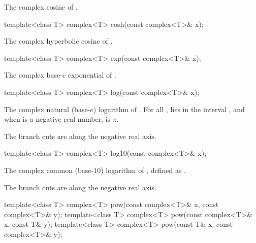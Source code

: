 \begin{itemdescr}
\pnum
\returns
The complex cosine of .
\end{itemdescr}

%
\begin{itemdecl}
template<class T> complex<T> cosh(const complex<T>& x);
\end{itemdecl}

\begin{itemdescr}
\pnum
\returns
The complex hyperbolic cosine of .
\end{itemdescr}

%
\begin{itemdecl}
template<class T> complex<T> exp(const complex<T>& x);
\end{itemdecl}

\begin{itemdescr}
\pnum
\returns
The complex base-$e$ exponential of .
\end{itemdescr}

%
\begin{itemdecl}
template<class T> complex<T> log(const complex<T>& x);
\end{itemdecl}

\begin{itemdescr}
\pnum
\returns
The complex natural (base-$e$) logarithm of . For all ,
 lies in the interval \crange{$-\pi$}{$\pi$}, and
when  is a negative real number,  is $\pi$.

\pnum
\remarks
The branch cuts are along the negative real axis.
\end{itemdescr}

%
\begin{itemdecl}
template<class T> complex<T> log10(const complex<T>& x);
\end{itemdecl}

\begin{itemdescr}
\pnum
\returns
The complex common (base-$10$) logarithm of , defined as
.

\pnum
\remarks
The branch cuts are along the negative real axis.
\end{itemdescr}

%
\begin{itemdecl}
template<class T> complex<T> pow(const complex<T>& x, const complex<T>& y);
template<class T> complex<T> pow(const complex<T>& x, const T& y);
template<class T> complex<T> pow(const T& x, const complex<T>& y);
\end{itemdecl}

